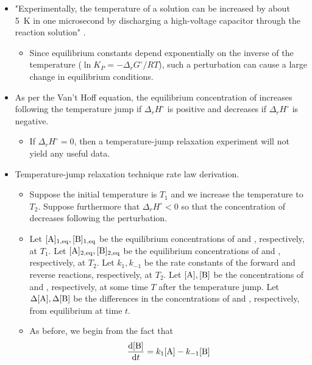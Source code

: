 \documentclass[../notes.tex]{subfiles}
\begin{document}
\begin{itemize}
\begin{itemize}
    \end{itemize}
    \item "Experimentally, the temperature of a solution can be increased by about \SI{5}{\kelvin} in one microsecond by discharging a high-voltage capacitor through the reaction solution" \parencite[1067]{bib:McQuarrieSimon}.
    \begin{itemize}
        \item Since equilibrium constants depend exponentially on the inverse of the temperature ($\ln K_P=-\Delta_rG^\circ/RT$), such a perturbation can cause a large change in equilibrium conditions.
    \end{itemize}
    \item As per the Van't Hoff equation, the equilibrium concentration of  increases following the temperature jump if $\Delta_rH^\circ$ is positive and decreases if $\Delta_rH^\circ$ is negative.
    \begin{itemize}
        \item If $\Delta_rH^\circ=0$, then a temperature-jump relaxation experiment will not yield any useful data.
    \end{itemize}
    \item Temperature-jump relaxation technique rate law derivation.
    \begin{itemize}
        \item Suppose the initial temperature is $T_1$ and we increase the temperature to $T_2$. Suppose furthermore that $\Delta_rH^\circ<0$ so that the concentration of  decreases following the perturbation.
        \item Let $[\ce{A}]_{1,\text{eq}},[\ce{B}]_{1,\text{eq}}$ be the equilibrium concentrations of  and , respectively, at $T_1$. Let $[\ce{A}]_{2,\text{eq}},[\ce{B}]_{2,\text{eq}}$ be the equilibrium concentrations of  and , respectively, at $T_2$. Let $k_1,k_{-1}$ be the rate constants of the forward and reverse reactions, respectively, at $T_2$. Let $[\ce{A}],[\ce{B}]$ be the concentrations of  and , respectively, at some time $T$ after the temperature jump. Let $\Delta[\ce{A}],\Delta[\ce{B}]$ be the differences in the concentrations of  and , respectively, from equilibrium at time $t$.
        \item As before, we begin from the fact that
        \begin{equation*}
            \dv{[\ce{B}]}{t} = k_1[\ce{A}]-k_{-1}[\ce{B}]
        \end{equation*}
        \begin{itemize}

\end{itemize}
\end{itemize}
\end{itemize}
\end{document}
